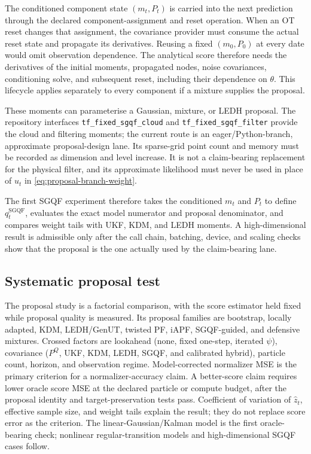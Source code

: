 \documentclass[11pt]{article}
\begin{document}
The conditioned component state $(m_t,P_t)$ is carried into the next
prediction through the declared component-assignment and reset operation.
When an OT reset changes that assignment, the covariance provider must consume
the actual reset state and propagate its derivatives. Reusing a fixed
$(m_0,P_0)$ at every date would omit observation dependence. The analytical
score therefore needs the derivatives of the initial moments, propagated
nodes, noise covariances, conditioning solve, and subsequent reset, including
their dependence on $\theta$. This lifecycle applies separately to every
component if a mixture supplies the proposal.

These moments can parameterise a Gaussian, mixture, or LEDH proposal. The
repository interfaces \texttt{tf\_fixed\_sgqf\_cloud} and
\texttt{tf\_fixed\_sgqf\_filter} provide the cloud and filtering moments; the
current route is an eager/Python-branch, approximate proposal-design lane.
Its sparse-grid point count and memory must be recorded as dimension and level
increase. It is not a claim-bearing replacement for the physical filter, and
its approximate likelihood must never be used in place of $u_t$ in
\eqref{eq:proposal-branch-weight}.

The first SGQF experiment therefore takes the conditioned $m_t$ and $P_t$ to define
$q_t^{\mathrm{SGQF}}$, evaluates the exact model numerator and proposal
denominator, and compares weight tails with UKF, KDM, and LEDH moments. A
high-dimensional result is admissible only after the call chain, batching,
device, and scaling checks show that the proposal is the one actually used by
the claim-bearing lane.

\subsection{Systematic proposal test}

The proposal study is a factorial comparison, with the score estimator held
fixed while proposal quality is measured. Its proposal families are bootstrap,
locally adapted, KDM, LEDH/GenUT, twisted PF, iAPF, SGQF-guided, and defensive
mixtures. Crossed factors are lookahead (none, fixed one-step, iterated $\psi$),
covariance ($P^Q$, UKF, KDM, LEDH, SGQF, and calibrated hybrid), particle count,
horizon, and observation regime. Model-corrected normalizer MSE is the primary
criterion for a normalizer-accuracy claim. A better-score claim requires lower
oracle score MSE at the declared particle or compute budget, after the proposal
identity and target-preservation tests pass. Coefficient of variation of
$\widehat z_t$, effective sample size, and weight tails explain the result;
they do not replace score error as the criterion.
The linear-Gaussian/Kalman model is the first oracle-bearing check; nonlinear
regular-transition models and high-dimensional SGQF cases follow.
\end{document}
